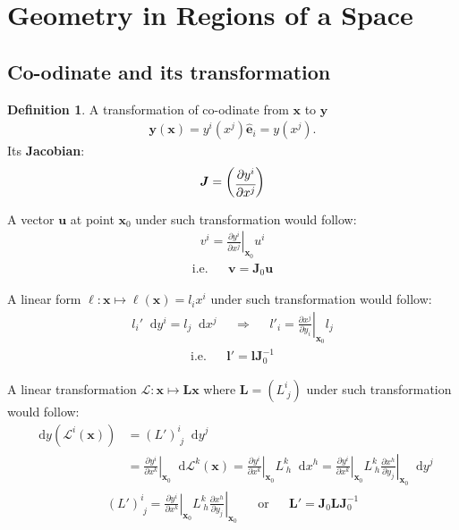 \documentclass{article}
\theoremstyle{plain}
\theoremstyle{definition}
\newtheorem{dfn}{Definition}[section] %
\newcommand\dif{\mathop{}\!\mathrm{d}}
\newcommand*{\basis}[1]{\hat{\boldsymbol{#1}}}
\newcommand*{\bv}{\boldsymbol}
\newcommand*{\bm}{\boldsymbol}
\newcommand*{\indexbf}[1]{\textbf{#1}\index{#1}}
\begin{document}
\tableofcontents
\newpage
\section{Geometry in Regions of a Space}
\subsection{Co-odinate and its transformation}
\begin{dfn}
A transformation of co-odinate from $\boldsymbol{x}$ to $\boldsymbol{y}$
\begin{align*}
	\bv y(\bv x ) = y^i(x^j)\basis e_i=y(x^j).
\end{align*}
Its \indexbf{Jacobian}:
\begin{align}\label{Jacobian of transformation}
	\bm J = 
	\begin{pmatrix}
		\cfrac{\partial y^i}{\partial x^j}
	\end{pmatrix}
\end{align}
\end{dfn}
A vector $\bv u$ at point $\bv x_0$ under such transformation would follow:
\begin{align}\label{vector}
	v^i = \left.\frac{\partial y^i}{\partial x^j}\right|_{\bv x_0} u^i
\end{align}
\begin{align*}
	\text{i.e.}&&
	\bv v = \bm J_0\bv u
\end{align*}

A linear form $\ell: \bv x\mapsto\ell(\bv x) =l_ix^i $ under such transformation would follow:
\begin{align}\label{linear form}
	l_i'\dif y^i = l_j\dif x^j 
	&&\Rightarrow&&
	l'_i = \left.\frac{\partial x^j}{\partial y_i}\right|_{\bv x_0}l_j
\end{align}
\begin{align*}
	\text{i.e.}&&
	\bv l' = \bv l \bm J^{-1}_0
\end{align*}

A linear transformation $\mathscr{L}:\bv x \mapsto \bm L\bv x$ where $\bm L = \left( L^i_{\;j}\right)$ under such transformation would follow:
\begin{align*}
	\dif y\left(\mathscr L^i(\bv x)\right) 
	&=(L')^i_{\;j} \dif y^j 
	\\
	&=  \left.\frac{\partial y^i}{\partial x^k}\right|_{\bv x_0} \dif \mathscr L^k (\bv x)
	=\left.\frac{\partial y^i}{\partial x^k}\right|_{\bv x_0} L^k_{\;h} \dif x^h
	=\left.\frac{\partial y^i}{\partial x^k}\right|_{\bv x_0} 
	L^k_{\;h} 
	\left.\frac{\partial x^h}{\partial y_j}\right|_{\bv x_0}\dif y^j
\end{align*} 
\begin{align}\label{linear transformation} 
	(L')^i_{\;j} = 
	\left.\frac{\partial y^i}{\partial x^k}\right|_{\bv x_0} 
	L^k_{\;h} 
	\left.\frac{\partial x^h}{\partial y_j}\right|_{\bv x_0} 
	&&\text{or}&&
	\bm L'  = \bm J_0\bm L\bm J^{-1}_0 
\end{align} 
\end{document}
